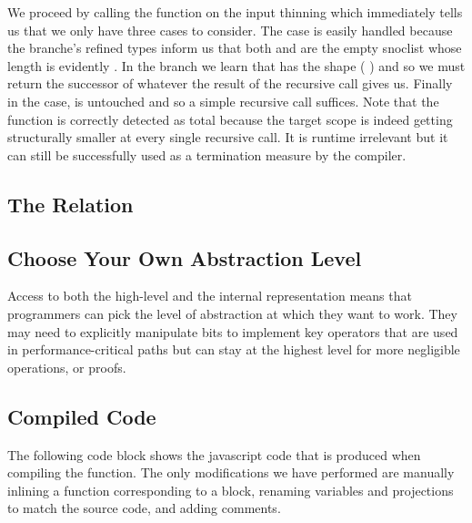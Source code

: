 \documentclass{article}
\begin{document}

We proceed by calling the  function on the input thinning
which immediately tells us that we only have three cases to consider.
%
The  case is easily handled because the branche's refined
types inform us that both  and  are the
empty snoclist \IdrisData{[<]} whose length is evidently .
%
In the  branch we learn that  has the shape
(\IdrisBound{\KatlaUnderscore} \IdrisData{:<} ) and so we must return the
successor of whatever the result of the recursive call gives us.
%
Finally in the  case,  is untouched and so a
simple recursive call suffices.
%
Note that the function is correctly detected as total because the target scope
 is indeed getting structurally smaller at every single recursive
call.
%
It is runtime irrelevant but it can still be successfully used as a termination
measure by the compiler.

\subsection{The  Relation}


\subsection{Choose Your Own Abstraction Level}

Access to both the high-level  and the internal 
representation means that programmers can pick the level of abstraction at which they
want to work.
%
They may need to explicitly manipulate bits to implement key operators that are used
in performance-critical paths but can stay at the highest level for more negligible
operations, or proofs.


\subsection{Compiled Code}

The following code block shows the javascript code that is produced when compiling the
 function.
%
The only modifications we have performed are manually inlining a function
corresponding to a  block, renaming variables and projections
to match the source code, and adding comments.
\end{document}
